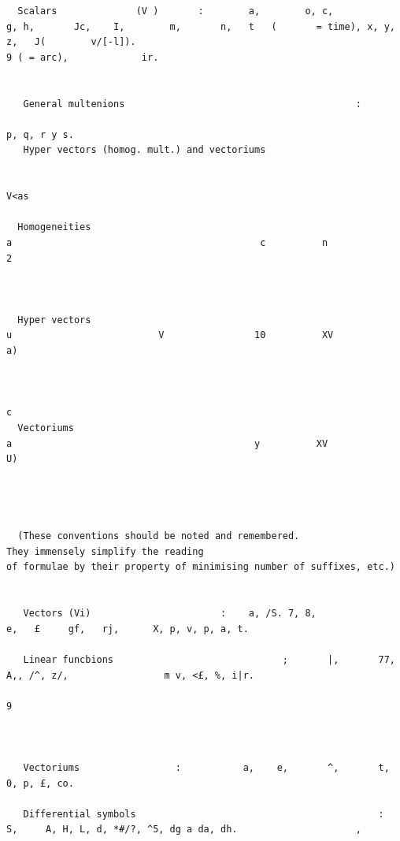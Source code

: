 \documentclass[10pt]{article}
\begin{document}
\begin{verbatim}
  Scalars              (V )       :        a,        o, c,                g, h,       Jc,    I,        m,       n,   t   (       = time), x, y,      z,   J(        v/[-l]).
9 ( = arc),             ir.


   General multenions                                         :
                                                                      p, q, r y s.
   Hyper vectors (homog. mult.) and vectoriums

                                                                                                  V<as

  Homogeneities                                                                                   a                                            c          n               2



  Hyper vectors                                                                                   u                          V                10          XV              a)


                                                                                                   c
  Vectoriums                                                                                       a                                           y          XV              U)




  (These conventions should be noted and remembered.                                                                                They immensely simplify the reading
of formulae by their property of minimising number of suffixes, etc.)


   Vectors (Vi)                       :    a, /S. 7, 8,                          e,   £     gf,   rj,      X, p, v, p, a, t.

   Linear funcbions                              ;       |,       77, A,, /^, z/,                 m v, <£, %, i|r.
                                                                                                       9



   Vectoriums                 :           a,    e,       ^,       t,       0, p, £, co.

   Differential symbols                                           :       S,     A, H, L, d, *#/?, ^5, dg a da, dh.                     ,





\end{verbatim}
\end{document}
